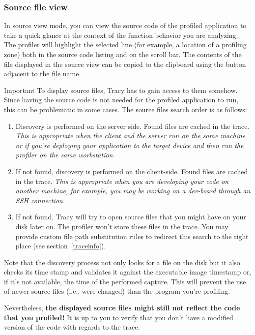 \documentclass[hidelinks,titlepage,a4paper,twoside]{article}
\begin{document}
\subsubsection{Source file view}

In source view mode, you can view the source code of the profiled application to take a quick glance at the context of the function behavior you are analyzing. The profiler will highlight the selected line (for example, a location of a profiling zone) both in the source code listing and on the scroll bar. The contents of the file displayed in the source view can be copied to the clipboard using the button adjacent to the file name.

\begin{bclogo}[
noborder=true,
couleur=black!5,
logo=\bcbombe
]{Important}
To display source files, Tracy has to gain access to them somehow. Since having the source code is not needed for the profiled application to run, this can be problematic in some cases. The source files search order is as follows:

\begin{enumerate}
\item Discovery is performed on the server side. Found files are cached in the trace. \emph{This is appropriate when the client and the server run on the same machine or if you're deploying your application to the target device and then run the profiler on the same workstation.}
\item If not found, discovery is performed on the client-side. Found files are cached in the trace. \emph{This is appropriate when you are developing your code on another machine, for example, you may be working on a dev-board through an SSH connection.}
\item If not found, Tracy will try to open source files that you might have on your disk later on. The profiler won't store these files in the trace. You may provide custom file path substitution rules to redirect this search to the right place (see section~\ref{traceinfo}).
\end{enumerate}

Note that the discovery process not only looks for a file on the disk but it also checks its time stamp and validates it against the executable image timestamp or, if it's not available, the time of the performed capture. This will prevent the use of newer source files (i.e., were changed) than the program you're profiling.

Nevertheless, \textbf{the displayed source files might still not reflect the code that you profiled!} It is up to you to verify that you don't have a modified version of the code with regards to the trace.
\end{bclogo}
\end{document}

